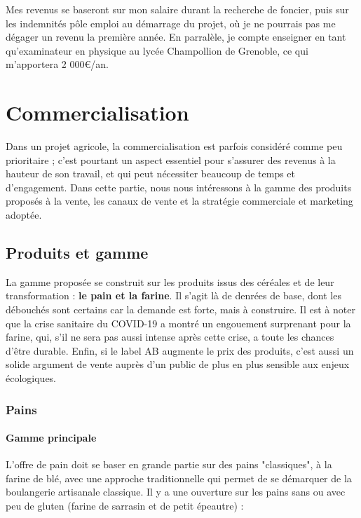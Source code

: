 \documentclass{book}
\begin{document}
Mes revenus se baseront sur mon salaire durant la recherche de foncier, puis sur les indemnités pôle emploi au démarrage du projet, où je ne pourrais pas me dégager un revenu la première année. En parralèle, je compte enseigner en tant qu'examinateur en physique au lycée Champollion de Grenoble, ce qui m'apportera 2 000\euro{}/an. 

\chapter{Commercialisation}

Dans un projet agricole, la commercialisation est parfois considéré comme peu prioritaire ; c'est pourtant un aspect essentiel pour s'assurer des revenus à la hauteur de son travail, et qui peut nécessiter beaucoup de temps et d'engagement. Dans cette partie, nous nous intéressons à la gamme des produits proposés à la vente, les canaux de vente et la stratégie commerciale et marketing adoptée. 

\section{Produits et gamme}

La gamme proposée se construit sur les produits issus des céréales et de leur transformation : \textbf{le pain et la farine}. Il s'agit là de denrées de base, dont les débouchés sont certains car la demande est forte, mais à construire. Il est à noter que la crise sanitaire du COVID-19 a montré un engouement surprenant pour la farine, qui, s'il ne sera pas aussi intense après cette crise, a toute les chances d'être durable. Enfin, si le label AB augmente le prix des produits, c'est aussi un solide argument de vente auprès d'un public de plus en plus sensible aux enjeux écologiques. 

\subsection{Pains}
\label{part:pains}

\subsubsection{Gamme principale}

L'offre de pain doit se baser en grande partie sur des pains "classiques", à la farine de blé, avec une approche traditionnelle qui permet de se démarquer de la boulangerie artisanale classique. Il y a une ouverture sur les pains sans ou avec peu de gluten (farine de sarrasin et de petit épeautre) :
\end{document}
